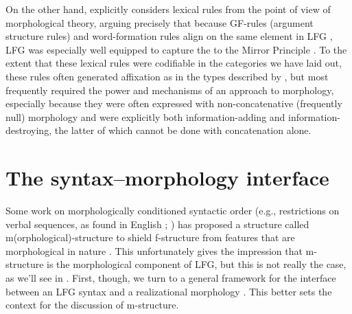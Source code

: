 \documentclass[output=paper,hidelinks]{langscibook}
\begin{document}
On the other hand, \citet{baker85} explicitly considers lexical rules
from the point of view of morphological theory, arguing precisely that
because GF-rules (argument structure rules) and word-formation rules
align on the same element in LFG \citep[i.e., the lexical rule as
developed in][]{bresnan1982the-passive}, LFG was especially well equipped to capture
the  to the Mirror Principle
\citep[409]{baker85}.  To the extent that these lexical rules were
codifiable in the categories we have laid out, these rules often
generated affixation as in the types described by \citet{baker85}, but
most frequently required the power and mechanisms of an 
 approach to morphology, especially because they were
often expressed with non-concatenative (frequently null) morphology
and were explicitly both information-adding and information-destroying,
the latter of which cannot be done with concatenation alone.






\section{The syntax--morphology interface}
\label{sec:Morph:interface}

Some work on morphologically conditioned syntactic order (e.g.,
restrictions on verbal sequences, as found in English ; \citealt{chomsky1957syntactic}) has proposed a structure called m(orphological)-structure
to shield f-structure from features that are morphological in nature
\citep{buttetal96,FrankZaenen2004}. This unfortunately gives the
impression that m-structure is the morphological component of LFG, but
this is not really the case, as we'll see in
. First, though, we turn to a general
framework for the interface between an LFG syntax and a realizational
morphology \citep{dalrymple15}. This better sets the context for the
discussion of m-structure. 
\end{document}
